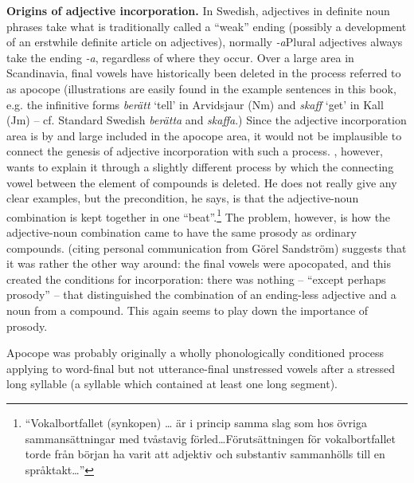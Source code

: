 \textbf{Origins of adjective incorporation.} In Swedish, adjectives in definite noun phrases take what is traditionally called a “weak” ending (possibly a development of an erstwhile definite article on adjectives), normally\textit{ {}-a}Plural adjectives always take the ending\textit{ {}-a}, regardless of where they occur. Over a large area in Scandinavia, final vowels have historically been deleted in the process referred to as apocope (illustrations are easily found in the example sentences in this book, e.g. the infinitive forms \textit{berätt} ‘tell’ in Arvidsjaur (Nm) and \textit{skaff} ‘get’ in Kall (Jm) – cf. Standard Swedish \textit{berätta} and \textit{skaffa}.) Since the adjective incorporation area is by and large included in the apocope area, it would not be implausible to connect the genesis of adjective incorporation with such a process. \citet[102]{Dahlstedt1962}, however, wants to explain it through a slightly different process by which the connecting vowel between the element of compounds is deleted. He does not really give any clear examples, but the precondition, he says, is that the adjective-noun combination is kept together in one “beat”.\footnote{ “Vokalbortfallet (synkopen) … är i princip samma slag som hos övriga sammansättningar med tvåstavig förled…Förutsättningen för vokalbortfallet torde från början ha varit att adjektiv och substantiv sammanhölls till en språktakt…”} The problem, however, is how the adjective-noun combination came to have the same prosody as ordinary compounds. \citet[159]{Vangsnes2003} (citing personal communication from Görel Sandström) suggests that it was rather the other way around: the final vowels were apocopated, and this created the conditions for incorporation: there was nothing – “except perhaps prosody” – that distinguished the combination of an ending-less adjective and a noun from a compound. This again seems to play down the importance of prosody.


Apocope was probably originally a wholly phonologically conditioned process applying to word-final but not utterance-final unstressed vowels after a stressed long syllable (a syllable which contained at least one long segment).


